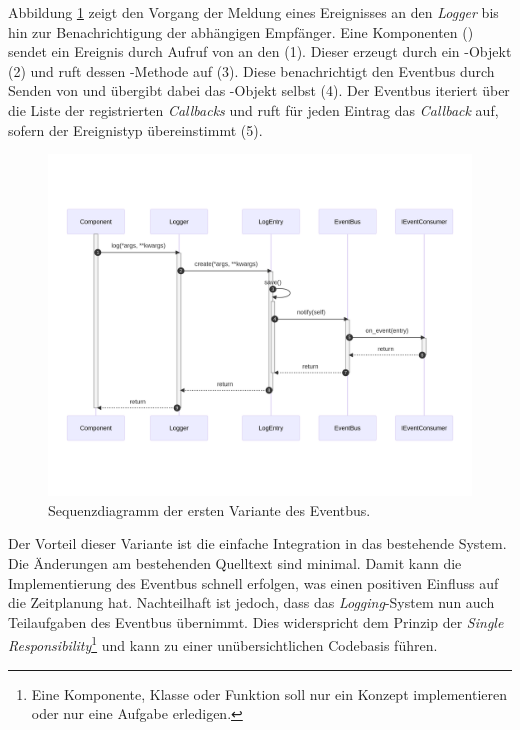 Abbildung \ref{fig:eventbus-v1-seq} zeigt den Vorgang der Meldung eines Ereignisses an den \emph{Logger} bis hin zur Benachrichtigung der abhängigen Empfänger. Eine Komponenten () sendet ein Ereignis durch Aufruf von  an den  (1). Dieser erzeugt durch  ein -Objekt (2) und ruft dessen -Methode auf (3). Diese benachrichtigt den Eventbus durch Senden von  und übergibt dabei das -Objekt selbst (4). Der Eventbus iteriert über die Liste der registrierten \emph{Callbacks} und ruft für jeden Eintrag das \emph{Callback} auf, sofern der Ereignistyp übereinstimmt (5).\\

\begin{figure}[H]
	\centering
	\includegraphics[width=1.0\linewidth]{images/diagrams/eventbus-v1-seq.png}
	\caption{Sequenzdiagramm der ersten Variante des Eventbus.}
	\label{fig:eventbus-v1-seq}
\end{figure}

Der Vorteil dieser Variante ist die einfache Integration in das bestehende System. Die Änderungen am bestehenden Quelltext sind minimal. Damit kann die Implementierung des Eventbus schnell erfolgen, was einen positiven Einfluss auf die Zeitplanung hat. Nachteilhaft ist jedoch, dass das \emph{Logging}-System nun auch Teilaufgaben des Eventbus übernimmt. Dies widerspricht dem Prinzip der \emph{Single Responsibility}\footnote{Eine Komponente, Klasse oder Funktion soll nur ein Konzept implementieren oder nur eine Aufgabe erledigen.} und kann zu einer unübersichtlichen Codebasis führen.

